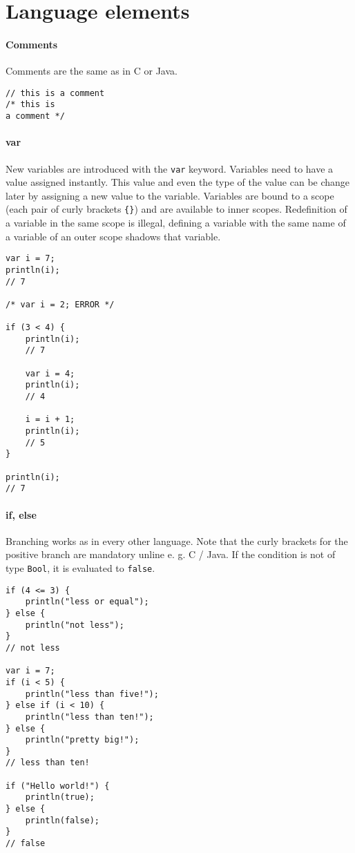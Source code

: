 \documentclass[a4paper, parskip, 10pt]{scrartcl}
\begin{document}
\section{Language elements}
\paragraph{Comments}
Comments are the same as in C or Java.

\begin{lstlisting}
// this is a comment
/* this is 
a comment */
\end{lstlisting}

\paragraph{var}
New variables are introduced with the \texttt{var} keyword. Variables need to
have a value assigned instantly. This value and even the type of the value can
be change later by assigning a new value to the variable. Variables are bound
to a scope (each pair of curly brackets \texttt{\{\}}) and are available to
inner scopes. Redefinition of a variable in the same scope is illegal, defining
a variable with the same name of a variable of an outer scope shadows that
variable.

\begin{lstlisting}
var i = 7;
println(i);
// 7

/* var i = 2; ERROR */

if (3 < 4) {
    println(i);
    // 7
    
    var i = 4;
    println(i);
    // 4
    
    i = i + 1;
    println(i);
    // 5
}

println(i);
// 7
\end{lstlisting}

\paragraph{if, else}
Branching works as in every other language. Note that the curly brackets for
the positive branch are mandatory unline e. g. C / Java. If the condition is
not of type \texttt{Bool}, it is evaluated to \texttt{false}.

\begin{lstlisting}
if (4 <= 3) {
    println("less or equal");
} else {
    println("not less");
}
// not less

var i = 7;
if (i < 5) {
    println("less than five!");
} else if (i < 10) {
    println("less than ten!");
} else {
    println("pretty big!");
}
// less than ten!

if ("Hello world!") {
    println(true);
} else {
    println(false);
}
// false
\end{lstlisting}
\end{document}
